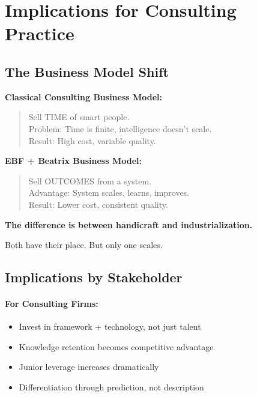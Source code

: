 
\section{Implications for Consulting Practice}
\label{sec:consulting-implications}

\subsection{The Business Model Shift}

\begin{tcolorbox}[colback=gray!5!white, colframe=gray!75!black,
    title=\textbf{From Handicraft to Industrialization}]

\textbf{Classical Consulting Business Model:}
\begin{quote}
Sell TIME of smart people.\\
Problem: Time is finite, intelligence doesn't scale.\\
Result: High cost, variable quality.
\end{quote}

\textbf{EBF + Beatrix Business Model:}
\begin{quote}
Sell OUTCOMES from a system.\\
Advantage: System scales, learns, improves.\\
Result: Lower cost, consistent quality.
\end{quote}

\textbf{The difference is between handicraft and industrialization.}

Both have their place. But only one scales.

\end{tcolorbox}

\subsection{Implications by Stakeholder}

\paragraph{For Consulting Firms:}
\begin{itemize}[nosep]
    \item Invest in framework + technology, not just talent
    \item Knowledge retention becomes competitive advantage
    \item Junior leverage increases dramatically
    \item Differentiation through prediction, not description
\end{itemize}

